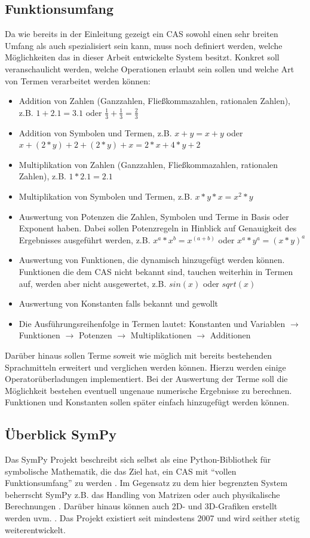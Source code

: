 \documentclass[11pt,a4paper, ngerman]{article}
\begin{document}
\subsection{Funktionsumfang}
Da wie bereits in der Einleitung gezeigt ein CAS sowohl einen sehr breiten Umfang als auch spezialisiert sein kann, muss noch definiert werden, welche Möglichkeiten das in dieser Arbeit entwickelte System besitzt. Konkret soll veranschaulicht werden, welche Operationen erlaubt sein sollen und welche Art von Termen verarbeitet werden können:
\begin{itemize}
    \item Addition von Zahlen (Ganzzahlen, Fließkommazahlen, rationalen Zahlen), z.B. $1+2.1 = 3.1$ oder $\frac{1}{3} + \frac{1}{3} = \frac{2}{3}$
    \item Addition von Symbolen und Termen, z.B. $x+y = x+y$ oder $x+(2*y)+2+(2*y)+x = 2*x+4*y+2$
    \item Multiplikation von Zahlen (Ganzzahlen, Fließkommazahlen, rationalen Zahlen), z.B. $1*2.1 = 2.1$
    \item Multiplikation von Symbolen und Termen, z.B. $x*y*x = x^2*y$
    \item Auswertung von Potenzen die Zahlen, Symbolen und Terme in Basis oder Exponent haben. Dabei sollen Potenzregeln in Hinblick auf Genauigkeit des Ergebnisses ausgeführt werden, z.B. $x^a*x^b=x^{(a+b)}$ oder $x^a*y^a = (x*y)^a$
    \item Auswertung von Funktionen, die dynamisch hinzugefügt werden können. Funktionen die dem CAS nicht bekannt sind, tauchen weiterhin in Termen auf, werden aber nicht ausgewertet, z.B. $sin(x)$ oder $sqrt(x)$
    \item Auswertung von Konstanten falls bekannt und gewollt
    \item Die Ausführungsreihenfolge in Termen lautet: Konstanten und Variablen $\rightarrow$ Funktionen $\rightarrow$ Potenzen $\rightarrow$ Multiplikationen $\rightarrow$ Additionen
\end{itemize}

Darüber hinaus sollen Terme soweit wie möglich mit bereits bestehenden Sprachmitteln erweitert und verglichen werden können. Hierzu werden einige Operatorüberladungen implementiert. Bei der Auswertung der Terme soll die Möglichkeit bestehen eventuell ungenaue numerische Ergebnisse zu berechnen. Funktionen und Konstanten sollen später einfach hinzugefügt werden können.

\subsection{Überblick SymPy}
Das SymPy Projekt beschreibt sich selbst als eine Python-Bibliothek für symbolische Mathematik, die das Ziel hat, ein CAS mit ``vollen Funktionsumfang'' zu werden \cite{SymPyAbout}. Im Gegensatz zu dem hier begrenzten System beherrscht SymPy z.B. das Handling von Matrizen \cite[S. 11]{SympyPeerJ} oder auch physikalische Berechnungen \cite[S. 14 ff.]{SympyPeerJ}. Darüber hinaus können auch 2D- und 3D-Grafiken erstellt werden \cite{SymPyPlot} uvm. \cite[S. 4 ff.]{SympyPeerJ}. Das Projekt existiert seit mindestens 2007 \cite{SymPyFirstCommit} und wird seither stetig weiterentwickelt.
\end{document}
